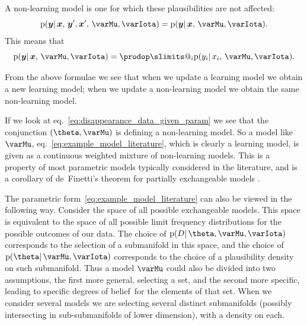 \documentclass[\ifafour a4paper,12pt,\else a5paper,10pt,\fi%
onecolumn,oneside,article,%
british%
]{memoir}
\makeatletter
\theoremstyle{remark}
\theoremstyle{innote}
\def\prod{\DOTSI\prodop\slimits@}
\newcommand*{\citep}{\parencites}
\newcommand*{\pf}{\mathrm{p}}%
\renewcommand*{\|}{\mathpunct{|}}
\newcommand*{\sect}{\S}%
\newcommand*{\eqn}{eq.}%
\newcommand*{\dobs}{degrees of belief}
\newcommand*{\yM}{\varMu}
\newcommand*{\yx}{\bm{x}}
\newcommand*{\yy}{\bm{y}}
\newcommand*{\yI}{\varIota}
\newcommand*{\yD}{D}
\newcommand*{\yHm}{\yM}
\makeatother
\begin{document}
A non-learning model is one for which these plausibilities are not affected:
\begin{equation}
  \label{eq:non-learning_def}
  \pf(\yy  \| \yx,\, \yy', \yx',\, \yM, \yI) =
  \pf(\yy  \| \yx,\, \yM, \yI).
\end{equation}
This means that 
\begin{equation}
  \label{eq:non-learning_indep}
  \pf(\yy  \| \yx,\, \yM, \yI) = \prod_i  \pf(y_i \| x_i,\, \yM, \yI).
\end{equation}

From the above formulae we see that when we update a learning model we
obtain a new learning model; when we update a non-learning model we obtain
the same non-learning model.

\medskip

If we look at \eqn~\eqref{eq:disappearance_data_given_param} we see that
the conjunction $(\theta,\yHm)$ is defining a non-learning model. So a
model like $\yHm$, \eqn~\eqref{eq:example_model_literature}, which is
clearly a learning model, is given as a continuous weighted mixture of
non-learning models. This is a property of most parametric models typically
considered in the literature, and is a corollary of de~Finetti's theorem
for partially exchangeable models
\citep{definetti1938}[\sect~4.6]{bernardoetal1994_r2000}.

The parametric form~\eqref{eq:example_model_literature} can also be viewed
in the following way. Consider the space of all possible exchangeable
models. This space is equivalent to the space of all possible limit
frequency distributions for the possible outcomes of our data. The choice
of $\pf(\yD \| \theta,\yHm,\yI)$ corresponds to the selection of a
submanifold in this space, and the choice of $\pf(\theta \|\yHm,\yI)$
corresponds to the choice of a plausibility density on such submanifold.
Thus a model $\yHm$ could also be divided into two assumptions, the first
more general, selecting a set, and the second more specific, leading to
specific \dobs\ for the elements of that set. When we consider several
models we are selecting several distinct submanifolds (possibly
intersecting in sub-submanifolds of lower dimension), with a density on
each.
\end{document}
